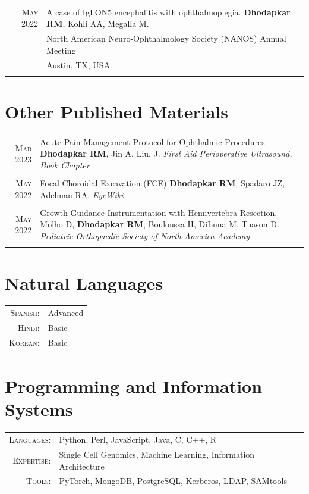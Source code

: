 \documentclass[a4paper,10pt]{article}
\begin{document}
\begin{tabular}{rp{11cm}}
 \textsc{May} 2022 & A case of IgLON5 encephalitis with ophthalmoplegia. {\bf Dhodapkar RM}, Kohli AA, Megalla M. \\
 								 & North American Neuro-Ophthalmology Society (NANOS) Annual Meeting \\
 								 & Austin, TX, USA  \\
 \multicolumn{2}{c}{} \\
\end{tabular}


\section{Other Published Materials}
\begin{tabular}{rp{11cm}}
 \textsc{Mar} 2023 &  Acute Pain Management Protocol for Ophthalmic Procedures {\bf Dhodapkar RM}, Jin A, Liu, J. {\it First Aid Perioperative Ultrasound, Book Chapter} \\
 \multicolumn{2}{c}{} \\
 \textsc{May} 2022 &  Focal Choroidal Excavation (FCE) {\bf Dhodapkar RM}, Spadaro JZ, Adelman RA. {\it EyeWiki} \\
 \multicolumn{2}{c}{} \\
 \textsc{May} 2022 &  Growth Guidance Instrumentation with Hemivertebra Resection.  Molho D, {\bf Dhodapkar RM}, Bouloussa H, DiLuna M, Tuason D. {\it Pediatric Orthopaedic Society of North America Academy} \\
 \multicolumn{2}{c}{}
\end{tabular}

\section{Natural Languages}
\begin{tabular}{rl}
\textsc{Spanish:}&Advanced\\
\textsc{Hindi:}&Basic\\
\textsc{Korean:}&Basic\\
\end{tabular}

\section{Programming and Information Systems}
\begin{tabular}{rl}
\textsc{Languages:}&Python, Perl, JavaScript, Java, C, C++, R\\
\textsc{Expertise:}&Single Cell Genomics, Machine Learning, Information Architecture\\
\textsc{Tools:}&PyTorch, MongoDB, PostgreSQL, Kerberos, LDAP, SAMtools
\end{tabular}
\end{document}
